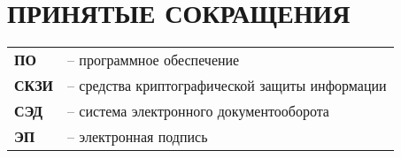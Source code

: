 \chapter*{ПРИНЯТЫЕ СОКРАЩЕНИЯ}							%

\begin{tabular}{ll}
\textbf{ПО} & -- программное обеспечение \\
\textbf{СКЗИ} & -- средства криптографической защиты информации \\
\textbf{СЭД} & -- система электронного документооборота \\
\textbf{ЭП} & -- электронная подпись \\
\end{tabular}


\clearpage